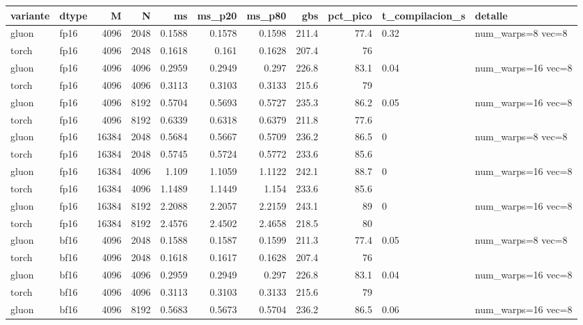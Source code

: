 \begin{table}[htbp]
  \centering\small
  \begin{tabular}{llrrrrrrrll}
    \toprule
    variante & dtype & M & N & ms & ms\_p20 & ms\_p80 & gbs & pct\_pico & t\_compilacion\_s & detalle \\
    \midrule
    gluon & fp16 & 4096 & 2048 & 0.1588 & 0.1578 & 0.1598 & 211.4 & 77.4 & 0.32 & num\_warps=8 vec=8 \\
    torch & fp16 & 4096 & 2048 & 0.1618 & 0.161 & 0.1628 & 207.4 & 76 &  &  \\
    gluon & fp16 & 4096 & 4096 & 0.2959 & 0.2949 & 0.297 & 226.8 & 83.1 & 0.04 & num\_warps=16 vec=8 \\
    torch & fp16 & 4096 & 4096 & 0.3113 & 0.3103 & 0.3133 & 215.6 & 79 &  &  \\
    gluon & fp16 & 4096 & 8192 & 0.5704 & 0.5693 & 0.5727 & 235.3 & 86.2 & 0.05 & num\_warps=16 vec=8 \\
    torch & fp16 & 4096 & 8192 & 0.6339 & 0.6318 & 0.6379 & 211.8 & 77.6 &  &  \\
    gluon & fp16 & 16384 & 2048 & 0.5684 & 0.5667 & 0.5709 & 236.2 & 86.5 & 0 & num\_warps=8 vec=8 \\
    torch & fp16 & 16384 & 2048 & 0.5745 & 0.5724 & 0.5772 & 233.6 & 85.6 &  &  \\
    gluon & fp16 & 16384 & 4096 & 1.109 & 1.1059 & 1.1122 & 242.1 & 88.7 & 0 & num\_warps=16 vec=8 \\
    torch & fp16 & 16384 & 4096 & 1.1489 & 1.1449 & 1.154 & 233.6 & 85.6 &  &  \\
    gluon & fp16 & 16384 & 8192 & 2.2088 & 2.2057 & 2.2159 & 243.1 & 89 & 0 & num\_warps=16 vec=8 \\
    torch & fp16 & 16384 & 8192 & 2.4576 & 2.4502 & 2.4658 & 218.5 & 80 &  &  \\
    gluon & bf16 & 4096 & 2048 & 0.1588 & 0.1587 & 0.1599 & 211.3 & 77.4 & 0.05 & num\_warps=8 vec=8 \\
    torch & bf16 & 4096 & 2048 & 0.1618 & 0.1617 & 0.1628 & 207.4 & 76 &  &  \\
    gluon & bf16 & 4096 & 4096 & 0.2959 & 0.2949 & 0.297 & 226.8 & 83.1 & 0.04 & num\_warps=16 vec=8 \\
    torch & bf16 & 4096 & 4096 & 0.3113 & 0.3103 & 0.3133 & 215.6 & 79 &  &  \\
    gluon & bf16 & 4096 & 8192 & 0.5683 & 0.5673 & 0.5704 & 236.2 & 86.5 & 0.06 & num\_warps=16 vec=8 \\

\end{tabular}
\end{table}
